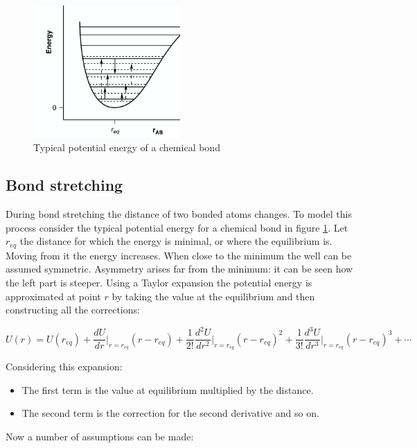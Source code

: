 \begin{figure}[H]
	\centering
	\includegraphics[width=0.5\textwidth]{chem-bond}
	\caption{Typical potential energy of a chemical bond}
	\label{fig:chem-bond}
\end{figure}

	\subsection{Bond stretching}
	During bond stretching the distance of two bonded atoms changes.
	To model this process consider the typical potential energy for a chemical bond in figure \ref{fig:chem-bond}.
	Let $r_{eq}$ the distance for which the energy is minimal, or where the equilibrium is.
	Moving from it the energy increases.
	When close to the minimum the well can be assumed symmetric.
	Asymmetry arises far from the minimum: it can be seen how the left part is steeper.
	Using a Taylor expansion the potential energy is approximated at point $r$ by taking the value at the equilibrium and then constructing all the corrections:

	$$U(r)=U(r_{eq}) + \frac{dU}{dr}\biggr\vert_{r=r_{eq}}(r-r_{eq})+\frac{1}{2!}\frac{d^2U}{dr^2}\biggr\vert_{r=r_{eq}}(r-r_{eq})^2+\frac{1}{3!}\frac{d^3U}{dr^3}\biggr\vert_{r=r_{eq}}(r-r_{eq})^3+\cdots$$

	Considering this expansion:

	\begin{multicols}{2}
	  \begin{itemize}
	    \item The first term is the value at equilibrium multiplied by the distance.
			\item The second term is the correction for the second derivative and so on.
	  \end{itemize}
	\end{multicols}

	Now a number of assumptions can be made:

